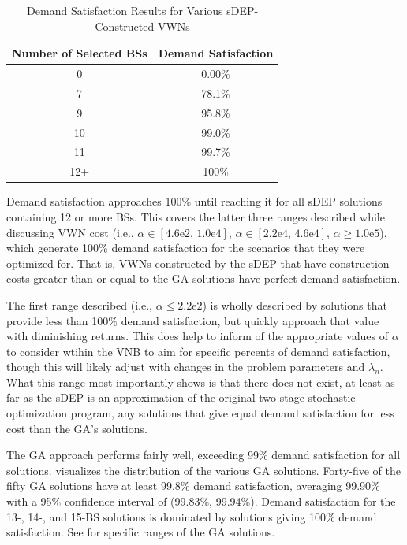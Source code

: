 \documentclass[12pt,dvipsnames]{report}
\newcommand{\expnumber}[2]{{#1}\mathrm{e}{#2}}
\begin{document}
\begin{table}[htp]
\centering
\caption[Preliminary Simulation Demand Satisfaction of sDEP-Constructed VWNs]{Demand Satisfaction Results for Various sDEP-Constructed VWNs}
\begin{tabular}{|c|c|} 
\hline
\textbf{Number of Selected BSs} & \textbf{Demand Satisfaction} \\
\hline
0 & 0.00\% \\
\hline
7 & 78.1\% \\
\hline
9 & 95.8\% \\
\hline
10 & 99.0\% \\
\hline
11 & 99.7\% \\
\hline
12+ & 100\% \\
\hline
\end{tabular}
\label{tab:Prelim_sDEPDemandSatisfaction}
\end{table}

Demand satisfaction approaches 100\% until reaching it for all sDEP solutions containing 12 or more BSs.  This covers the latter three ranges described while discussing VWN cost (i.e., $\alpha \in \left[ \expnumber{4.6}{2},\, \expnumber{1.0}{4} \right],\, \alpha \in \left[ \expnumber{2.2}{4},\, \expnumber{4.6}{4} \right],\, \alpha \geq \expnumber{1.0}{5}$), which generate 100\% demand satisfaction for the scenarios that they were optimized for.  That is, VWNs constructed by the sDEP that have construction costs greater than or equal to the GA solutions have perfect demand satisfaction.

The first range described (i.e., $\alpha \leq \expnumber{2.2}{2}$) is wholly described by solutions that provide less than 100\% demand satisfaction, but quickly approach that value with diminishing returns.  This does help to inform of the appropriate values of $\alpha$ to consider wtihin the VNB to aim for specific percents of demand satisfaction, though this will likely adjust with changes in the problem parameters and $\lambda_n$.  What this range most importantly shows is that there does not exist, at least as far as the sDEP is an approximation of the original two-stage stochastic optimization program, any solutions that give equal demand satisfaction for less cost than the GA's solutions.

The GA approach performs fairly well, exceeding 99\% demand satisfaction for all solutions.   visualizes the distribution of the various GA solutions.  Forty-five of the fifty GA solutions have at least 99.8\% demand satisfaction, averaging 99.90\% with a 95\% confidence interval of (99.83\%, 99.94\%).  Demand satisfaction for the 13-, 14-, and 15-BS solutions is dominated by solutions giving 100\% demand satisfaction.  See  for specific ranges of the GA solutions.
\end{document}
